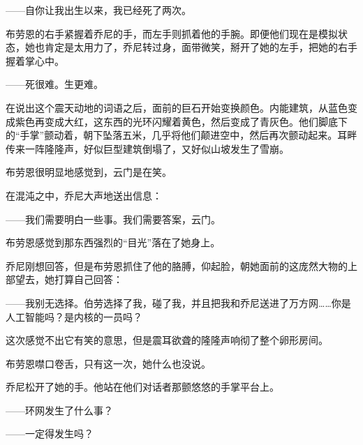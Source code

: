 \documentclass[AutoFakeBold=true]{book}
\begin{document}
{\kaishu ——自你让我出生以来，我已经死了两次。}

{}

布劳恩的右手紧握着乔尼的手，而左手则抓着他的手腕。即便他们现在是模拟状态，她也肯定是太用力了，乔尼转过身，面带微笑，掰开了她的左手，把她的右手握着掌心中。

{\kaishu ——死很难。生更难。}

{\heiti [嚇！]}

在说出这个震天动地的词语之后，面前的巨石开始变换颜色。内能建筑，从蓝色变成紫色再变成大红，这东西的光环闪耀着黄色，然后变成了青灰色。他们脚底下的``手掌''颤动着，朝下坠落五米，几乎将他们颠进空中，然后再次颤动起来。耳畔传来一阵隆隆声，好似巨型建筑倒塌了，又好似山坡发生了雪崩。

布劳恩很明显地感觉到，云门是在笑。

在混沌之中，乔尼大声地送出信息：

{\kaishu ——我们需要明白一些事。我们需要答案，云门。}

布劳恩感觉到那东西强烈的``目光''落在了她身上。

{}

乔尼刚想回答，但是布劳恩抓住了他的胳膊，仰起脸，朝她面前的这庞然大物的上部望去，她打算自己回答：

{\kaishu ——我别无选择。伯劳选择了我，碰了我，并且把我和乔尼送进了万方网……你是人工智能吗？是内核的一员吗？}

{\heiti [嚇！]}

这次感觉不出它有笑的意思，但是震耳欲聋的隆隆声响彻了整个卵形房间。

{}

布劳恩噤口卷舌，只有这一次，她什么也没说。

{}

乔尼松开了她的手。他站在他们对话者那颤悠悠的手掌平台上。

{\kaishu ——环网发生了什么事？}

{\heiti [它正在被毁灭]}

{\kaishu ——一定得发生吗？}
\end{document}
